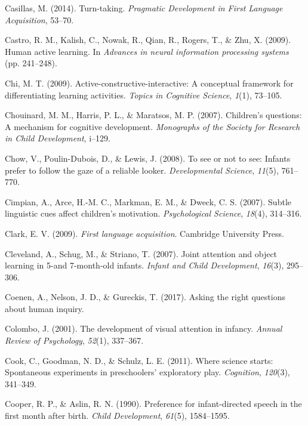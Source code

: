 \documentclass[oneside]{report}
\begin{document}
\hypertarget{ref-casillas2014turn}{}
Casillas, M. (2014). Turn-taking. \emph{Pragmatic Development in First
Language Acquisition}, 53--70.

\hypertarget{ref-castro2009human}{}
Castro, R. M., Kalish, C., Nowak, R., Qian, R., Rogers, T., \& Zhu, X.
(2009). Human active learning. In \emph{Advances in neural information
processing systems} (pp. 241--248).

\hypertarget{ref-chi2009active}{}
Chi, M. T. (2009). Active-constructive-interactive: A conceptual
framework for differentiating learning activities. \emph{Topics in
Cognitive Science}, \emph{1}(1), 73--105.

\hypertarget{ref-chouinard2007children}{}
Chouinard, M. M., Harris, P. L., \& Maratsos, M. P. (2007). Children's
questions: A mechanism for cognitive development. \emph{Monographs of
the Society for Research in Child Development}, i--129.

\hypertarget{ref-chow2008see}{}
Chow, V., Poulin-Dubois, D., \& Lewis, J. (2008). To see or not to see:
Infants prefer to follow the gaze of a reliable looker.
\emph{Developmental Science}, \emph{11}(5), 761--770.

\hypertarget{ref-cimpian2007subtle}{}
Cimpian, A., Arce, H.-M. C., Markman, E. M., \& Dweck, C. S. (2007).
Subtle linguistic cues affect children's motivation. \emph{Psychological
Science}, \emph{18}(4), 314--316.

\hypertarget{ref-clark2009first}{}
Clark, E. V. (2009). \emph{First language acquisition}. Cambridge
University Press.

\hypertarget{ref-cleveland2007joint}{}
Cleveland, A., Schug, M., \& Striano, T. (2007). Joint attention and
object learning in 5-and 7-month-old infants. \emph{Infant and Child
Development}, \emph{16}(3), 295--306.

\hypertarget{ref-coenen2017asking}{}
Coenen, A., Nelson, J. D., \& Gureckis, T. (2017). Asking the right
questions about human inquiry.

\hypertarget{ref-colombo2001development}{}
Colombo, J. (2001). The development of visual attention in infancy.
\emph{Annual Review of Psychology}, \emph{52}(1), 337--367.

\hypertarget{ref-cook2011science}{}
Cook, C., Goodman, N. D., \& Schulz, L. E. (2011). Where science starts:
Spontaneous experiments in preschoolers' exploratory play.
\emph{Cognition}, \emph{120}(3), 341--349.

\hypertarget{ref-cooper1990preference}{}
Cooper, R. P., \& Aslin, R. N. (1990). Preference for infant-directed
speech in the first month after birth. \emph{Child Development},
\emph{61}(5), 1584--1595.
\end{document}
